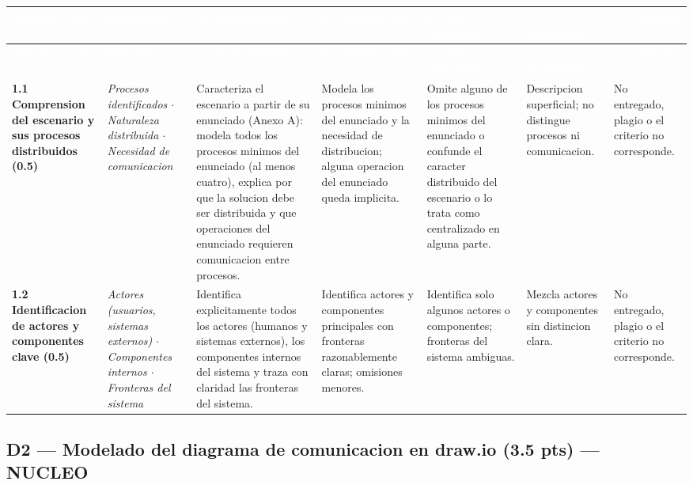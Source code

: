 \documentclass[10pt]{article}
\newcommand{\rubheader}{\rowcolor{uteqBlue}\textbf{\textcolor{white}{Criterio (peso)}} & \textbf{\textcolor{white}{Indicadores}} & \textbf{\textcolor{white}{4 -- Sobresaliente}} & \textbf{\textcolor{white}{3 -- Satisfactorio}} & \textbf{\textcolor{white}{2 -- En desarrollo}} & \textbf{\textcolor{white}{1 -- Insuficiente}} & \textbf{\textcolor{white}{0 -- Ausente}}\\\hline}
\begin{document}
\renewcommand{\arraystretch}{1.15}
\begin{xltabular}{\textwidth}{|>{\RaggedRight\small}p{2.7cm}|>{\RaggedRight\small}p{2.8cm}|>{\RaggedRight\small}X|>{\RaggedRight\small}X|>{\RaggedRight\small}X|>{\RaggedRight\small}X|>{\RaggedRight\small}X|}
	\hline
	\rubheader
	\endfirsthead
	\hline
	\rubheader
	\endhead
	\textbf{1.1 Comprension del escenario y sus procesos distribuidos (0.5)} & \textit{Procesos identificados $\cdot$ Naturaleza distribuida $\cdot$ Necesidad de comunicacion} & Caracteriza el escenario a partir de su enunciado (Anexo A): modela todos los procesos minimos del enunciado (al menos cuatro), explica por que la solucion debe ser distribuida y que operaciones del enunciado requieren comunicacion entre procesos. & Modela los procesos minimos del enunciado y la necesidad de distribucion; alguna operacion del enunciado queda implicita. & Omite alguno de los procesos minimos del enunciado o confunde el caracter distribuido del escenario o lo trata como centralizado en alguna parte. & Descripcion superficial; no distingue procesos ni comunicacion. & No entregado, plagio o el criterio no corresponde.\\
	\hline
	\textbf{1.2 Identificacion de actores y componentes clave (0.5)} & \textit{Actores (usuarios, sistemas externos) $\cdot$ Componentes internos $\cdot$ Fronteras del sistema} & Identifica explicitamente todos los actores (humanos y sistemas externos), los componentes internos del sistema y traza con claridad las fronteras del sistema. & Identifica actores y componentes principales con fronteras razonablemente claras; omisiones menores. & Identifica solo algunos actores o componentes; fronteras del sistema ambiguas. & Mezcla actores y componentes sin distincion clara. & No entregado, plagio o el criterio no corresponde.\\
	\hline
\end{xltabular}

\subsection{D2 --- Modelado del diagrama de comunicacion en draw.io (3.5 pts) --- NUCLEO}
\end{document}
